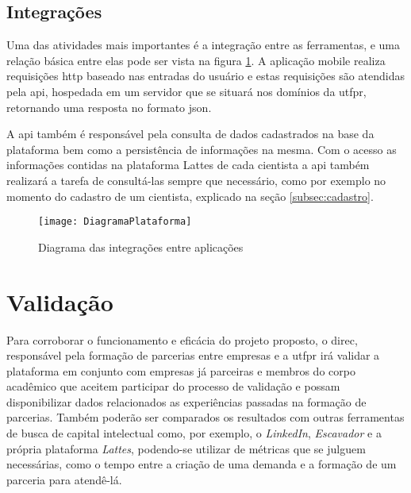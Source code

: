 \subsection{Integrações}\label{subsec:integrar}

Uma das atividades mais importantes é a integração entre as ferramentas, e uma relação básica entre elas pode ser vista na figura \ref{fig:diagrama}. A aplicação mobile realiza requisições \gls{http} baseado nas entradas do usuário e estas requisições são atendidas pela \gls{api}, hospedada em um servidor que se situará nos domínios da \gls{utfpr}, retornando uma resposta no formato \gls{json}.

A \gls{api} também é responsável pela consulta de dados cadastrados na base da plataforma bem como a persistência de informações na mesma. Com o acesso as informações contidas na plataforma Lattes de cada cientista a \gls{api} também realizará a tarefa de consultá-las sempre que necessário, como por exemplo no momento do cadastro de um cientista, explicado na seção \ref{subsec:cadastro}.

\begin{figure}[htb]
    \caption{Diagrama das integrações entre aplicações}
    \texttt{[image: DiagramaPlataforma]}
    \label{fig:diagrama}
\end{figure}

\section{Validação}\label{sec:validacao}

Para corroborar o funcionamento e eficácia do projeto proposto, o \gls{direc}, responsável pela formação de parcerias entre empresas e a \gls{utfpr} irá validar a plataforma em conjunto com empresas já parceiras e membros do corpo acadêmico que aceitem participar do processo de validação e possam disponibilizar dados relacionados as experiências passadas na formação de parcerias. Também poderão ser comparados os resultados com outras ferramentas de busca de capital intelectual como, por exemplo, o \textit{LinkedIn}, \textit{Escavador} e a própria plataforma \textit{Lattes}, podendo-se utilizar de métricas que se julguem necessárias, como o tempo entre a criação de uma demanda e a formação de um parceria para atendê-lá.